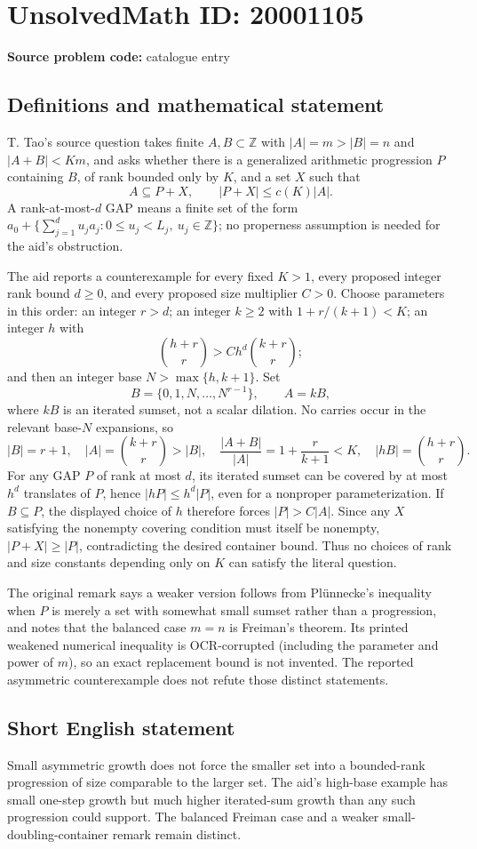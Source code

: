 \documentclass[11pt]{article}
\newcommand{\Z}{\mathbb{Z}}
\begin{document}
\section*{UnsolvedMath ID: 20001105}
\textbf{Source problem code:} catalogue entry
\subsection{Definitions and mathematical statement}
T. Tao's source question takes finite $A,B\subset\Z$ with $|A|=m>|B|=n$ and $|A+B|<Km$, and asks whether there is a generalized arithmetic progression $P$ containing $B$, of rank bounded only by $K$, and a set $X$ such that
\[
 A\subseteq P+X,\qquad |P+X|\leq c(K)|A|.
\]
A rank-at-most-$d$ GAP means a finite set of the form $a_0+\{\sum_{j=1}^d u_ja_j:0\leq u_j<L_j,\ u_j\in\Z\}$; no properness assumption is needed for the aid's obstruction.

The aid reports a counterexample for every fixed $K>1$, every proposed integer rank bound $d\geq0$, and every proposed size multiplier $C>0$. Choose parameters in this order: an integer $r>d$; an integer $k\geq2$ with $1+r/(k+1)<K$; an integer $h$ with
\[
 \binom{h+r}{r}>C h^d\binom{k+r}{r};
\]
and then an integer base $N>\max\{h,k+1\}$. Set
\[
 B=\{0,1,N,\ldots,N^{r-1}\},\qquad A=kB,
\]
where $kB$ is an iterated sumset, not a scalar dilation. No carries occur in the relevant base-$N$ expansions, so
\[
 |B|=r+1,\quad |A|=\binom{k+r}{r}>|B|,\quad
 \frac{|A+B|}{|A|}=1+\frac r{k+1}<K,\quad
 |hB|=\binom{h+r}{r}.
\]
For any GAP $P$ of rank at most $d$, its iterated sumset can be covered by at most $h^d$ translates of $P$, hence $|hP|\leq h^d|P|$, even for a nonproper parameterization. If $B\subseteq P$, the displayed choice of $h$ therefore forces $|P|>C|A|$. Since any $X$ satisfying the nonempty covering condition must itself be nonempty, $|P+X|\geq|P|$, contradicting the desired container bound. Thus no choices of rank and size constants depending only on $K$ can satisfy the literal question.

The original remark says a weaker version follows from Pl\"unnecke's inequality when $P$ is merely a set with somewhat small sumset rather than a progression, and notes that the balanced case $m=n$ is Freiman's theorem. Its printed weakened numerical inequality is OCR-corrupted (including the parameter and power of $m$), so an exact replacement bound is not invented. The reported asymmetric counterexample does not refute those distinct statements.
\subsection{Short English statement}
Small asymmetric growth does not force the smaller set into a bounded-rank progression of size comparable to the larger set. The aid's high-base example has small one-step growth but much higher iterated-sum growth than any such progression could support. The balanced Freiman case and a weaker small-doubling-container remark remain distinct.
\end{document}
